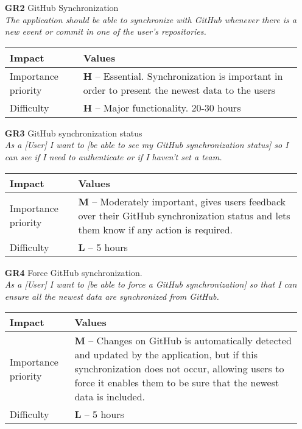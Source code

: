 \begin{itemize}
    \item[\textbf{GR2}] GitHub Synchronization\\
        \textit{\small{The application should be able to synchronize with GitHub whenever there is a new event or commit in one of the user's repositories.}}

        \begin{tabular}{| l | p{7cm} |}
            \hline
            \rowcolor[gray]{0.8}
            \textbf{Impact} & \textbf{Values} \\
            \hline
            Importance priority & \textbf{H} -- Essential. Synchronization is important in order to present the newest data to the users\\
            Difficulty & \textbf{H} -- Major functionality. 20-30 hours\\
            \hline
        \end{tabular}
    \vspace{0.5cm}

    \item[\textbf{GR3}] GitHub synchronization status \\
        \textit{\small{As a [User] I want to [be able to see my GitHub synchronization status] so I can see if I need to authenticate or if I haven't set a team.}}

        \begin{tabular}{| l | p{7cm} |}
            \hline
            \rowcolor[gray]{0.8}
            \textbf{Impact} & \textbf{Values} \\
            \hline
            Importance priority & \textbf{M} -- Moderately important, gives users feedback over their GitHub synchronization status and lets them know if any action is required.\\
            Difficulty & \textbf{L} -- 5 hours \\
            \hline
        \end{tabular}
    \vspace{0.5cm}

    \item[\textbf{GR4}] Force GitHub synchronization.\\
        \textit{\small{As a [User] I want to [be able to force a GitHub synchronization] so that I can ensure all the newest data are synchronized from GitHub.}}

        \begin{tabular}{| l | p{7cm} |}
            \hline
            \rowcolor[gray]{0.8}
            \textbf{Impact} & \textbf{Values} \\
            \hline
            Importance priority & \textbf{M} -- Changes on GitHub is automatically detected and updated by the application, but if this synchronization does not occur, allowing users to force it enables them to be sure that the newest data is included.\\
            Difficulty & \textbf{L} -- 5 hours \\
            \hline
        \end{tabular}
    \vspace{0.5cm}


\end{itemize}
